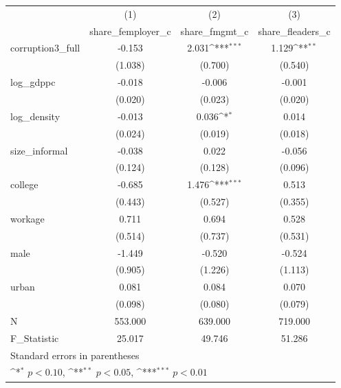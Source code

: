 {
\def\sym#1{\ifmmode^{#1}\else\(^{#1}\)\fi}
\begin{tabular}{l*{3}{c}}
\hline\hline
            &\multicolumn{1}{c}{(1)}&\multicolumn{1}{c}{(2)}&\multicolumn{1}{c}{(3)}\\
            &\multicolumn{1}{c}{share\_femployer\_c}&\multicolumn{1}{c}{share\_fmgmt\_c}&\multicolumn{1}{c}{share\_fleaders\_c}\\
\hline
corruption3\_full&      -0.153         &       2.031\sym{***}&       1.129\sym{**} \\
            &     (1.038)         &     (0.700)         &     (0.540)         \\
[1em]
log\_gdppc   &      -0.018         &      -0.006         &      -0.001         \\
            &     (0.020)         &     (0.023)         &     (0.020)         \\
[1em]
log\_density &      -0.013         &       0.036\sym{*}  &       0.014         \\
            &     (0.024)         &     (0.019)         &     (0.018)         \\
[1em]
size\_informal&      -0.038         &       0.022         &      -0.056         \\
            &     (0.124)         &     (0.128)         &     (0.096)         \\
[1em]
college     &      -0.685         &       1.476\sym{***}&       0.513         \\
            &     (0.443)         &     (0.527)         &     (0.355)         \\
[1em]
workage     &       0.711         &       0.694         &       0.528         \\
            &     (0.514)         &     (0.737)         &     (0.531)         \\
[1em]
male        &      -1.449         &      -0.520         &      -0.524         \\
            &     (0.905)         &     (1.226)         &     (1.113)         \\
[1em]
urban       &       0.081         &       0.084         &       0.070         \\
            &     (0.098)         &     (0.080)         &     (0.079)         \\
\hline
N           &     553.000         &     639.000         &     719.000         \\
F\_Statistic &      25.017         &      49.746         &      51.286         \\
\hline\hline
\multicolumn{4}{l}{\footnotesize Standard errors in parentheses}\\
\multicolumn{4}{l}{\footnotesize \sym{*} \(p<0.10\), \sym{**} \(p<0.05\), \sym{***} \(p<0.01\)}\\
\end{tabular}
}
